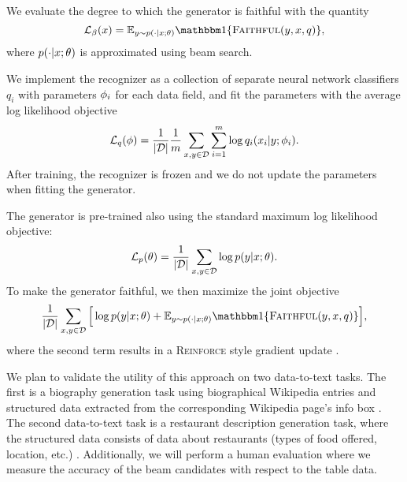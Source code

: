 We evaluate the degree to which the generator is faithful with the quantity
\[ \objective_\beamDistr(\evidence) = \E_{\utterance \sim p(\cdot|\evidence;\theta)} 
 \Ind{\faithful(\utterance, \evidence, \rec)}, \]
where $p(\cdot|x;\theta) $ is approximated using beam search.

We implement the recognizer as a collection of separate neural network 
classifiers $q_i$  with parameters $\phi_i$ for each data field,
 and fit the parameters  with 
the average log likelihood objective \[ \mathcal{L}_q(\phi) = 
\frac{1}{|\mathcal{D}|} \frac{1}{m} \sum_{x, y \in \mathcal{D}} \sum_{i=1}^m 
\log q_i(x_i|y;\phi_i).\] After training, the 
recognizer is frozen and we do not update the parameters when fitting the 
generator.

The generator is pre-trained also using the standard maximum log likelihood
objective: \[\mathcal{L}_p(\theta) = 
\frac{1}{|\mathcal{D}|} \sum_{x, y \in \mathcal{D}} 
\log p(y|x;\theta).\] To make the generator faithful,
we then maximize the joint objective \[
\frac{1}{|\dataset|} \sum_{\evidence, \utterance \in \dataset} 
\Big[
\log \gen(\utterance|\evidence;\genParams) + 
 \E_{\utterance \sim p(\cdot|\evidence;\theta)} 
 \Ind{\faithful(\utterance, \evidence, \rec)} \Big], 
\]
where the second term results in a \textsc{Reinforce} style gradient
update \citep{edunov2018classical}.




We plan to validate the utility of this approach on two data-to-text tasks. 
The first is a biography generation task using biographical Wikipedia
entries and structured data extracted from the corresponding Wikipedia page's
info box \citep{lebret2016neural}. The second data-to-text task is a 
restaurant description generation task, where the structured data consists
of data about restaurants (types of food offered, location, etc.) 
\citep{novikova2017e2e}.
Additionally, we will perform a human evaluation where we measure the accuracy
of the beam candidates with respect to the table data.


